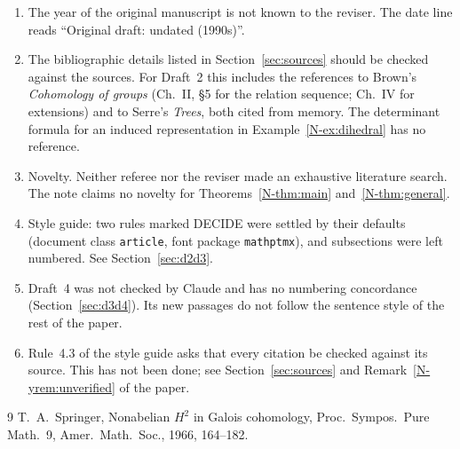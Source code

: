 \documentclass[12pt,letterpaper]{article}
\begin{document}
\begin{enumerate}[itemsep=1pt]
\item The year of the original manuscript is not known to the reviser.
  The date line reads ``Original draft: undated (1990s)''.
\item The bibliographic details listed in Section~\ref{sec:sources} should
  be checked against the sources. For Draft~2 this includes the
  references to Brown's \emph{Cohomology of groups} (Ch.~II, \S5 for the
  relation sequence; Ch.~IV for extensions) and to Serre's \emph{Trees},
  both cited from memory. The determinant formula for an induced
  representation in Example~\ref{N-ex:dihedral} has no reference.
\item Novelty. Neither referee nor the reviser made an exhaustive
  literature search. The note claims no novelty for
  Theorems~\ref{N-thm:main} and~\ref{N-thm:general}.
\item Style guide: two rules marked DECIDE were settled by their defaults
  (document class \texttt{article}, font package \texttt{mathptmx}), and
  subsections were left numbered. See Section~\ref{sec:d2d3}.
\item Draft~4 was not checked by Claude and has no numbering
  concordance (Section~\ref{sec:d3d4}). Its new passages do not follow
  the sentence style of the rest of the paper.
\item Rule~4.3 of the style guide asks that every citation be checked
  against its source. This has not been done; see
  Section~\ref{sec:sources} and Remark~\ref{N-yrem:unverified} of the
  paper.
\end{enumerate}

\begin{thebibliography}{9}
 T.~A.~Springer, Nonabelian $H^2$ in Galois cohomology,
Proc.\ Sympos.\ Pure Math.\ 9, Amer.\ Math.\ Soc., 1966, 164--182.
\end{thebibliography}
\end{document}
